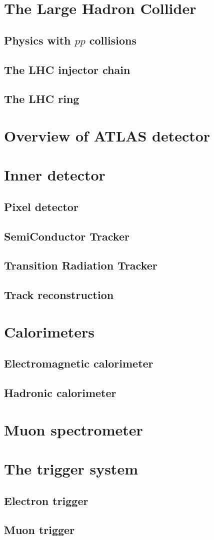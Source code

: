 \section{The Large Hadron Collider}
\subsection{Physics with $pp$ collisions}
\subsection{The LHC injector chain}
\subsection{The LHC ring}
\section{Overview of ATLAS detector}
\section{Inner detector}
\subsection{Pixel detector}
\subsection{SemiConductor Tracker}
\subsection{Transition Radiation Tracker}
\subsection{Track reconstruction}
\section{Calorimeters}
\subsection{Electromagnetic calorimeter}
\subsection{Hadronic calorimeter}
\section{Muon spectrometer}
\section{The trigger system}
\subsection{Electron trigger}
\subsection{Muon trigger}